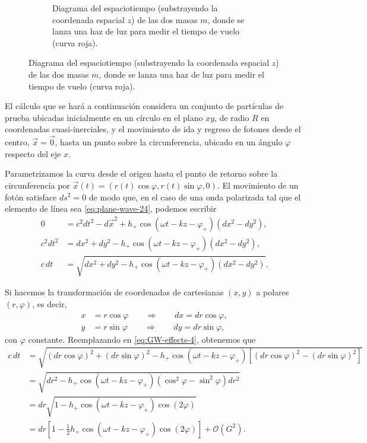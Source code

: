 \documentclass[letterpaper,11pt]{article}
\begin{document}
\begin{figure}
\begin{subfigure}[t]{0.39\textwidth}
        \caption{Diagrama del espaciotiempo (substrayendo la coordenada espacial $z$) de las dos masas $m$, donde se lanza una haz de luz para medir el tiempo de vuelo (curva roja).}
        \label{fig:Efecto-GW-2}
    \end{subfigure}
\end{figure}

El cálculo que se hará a continuación considera un conjunto de partículas de prueba ubicadas inicialmente en un círculo en el plano $xy$, de radio $R$ en coordenadas cuasi-inerciales, y el movimiento de ida y regreso de fotones desde el centro, $\vec{x} = \vec{0}$, hasta un punto sobre la circunferencia, ubicado en un ángulo $\varphi$ respecto del eje $x$.

Parametrizamos la curva desde el origen hasta el punto de retorno sobre la circunferencia por $\vec{x}(t) = (r(t) \cos\varphi, r(t) \sin\varphi,0)$. El movimiento de un fotón satisface $ds^2 = 0$ de modo que, en el caso de una onda polarizada tal que el elemento de línea sea \eqref{eq:plane-wave-24}, podemos escribir
\begin{align}
0 &= c^2dt^2 - d\vec{x}^2 + h_{+} \cos(\omega t -kz - \varphi_{+})(dx^2 - dy^2) , \\
c^2dt^2 &= dx^2 + dy^2 - h_{+} \cos(\omega t -kz - \varphi_{+})(dx^2 - dy^2), \\
c \,dt &= \sqrt{dx^2 + dy^2 - h_{+} \cos(\omega t -kz - \varphi_{+})(dx^2 - dy^2)}. \label{eq:GW-effects-4}
\end{align}

Si hacemos la transformación de coordenadas de cartesianas $(x,y)$ a polares $(r,\varphi)$, es decir,
\begin{align}
x &= r\cos\varphi \qquad \Rightarrow \qquad dx = dr \cos\varphi,\\
y &= r\sin\varphi \qquad \Rightarrow \qquad dy = dr \sin\varphi,
\end{align}
con $\varphi$ constante. Reemplazando en \eqref{eq:GW-effects-4}, obtenemos que
\begin{align}
c \,dt &= \sqrt{(dr \cos\varphi)^2 + (dr \sin\varphi)^2 - h_{+} \cos(\omega t -kz - \varphi_{+})[(dr \cos\varphi)^2 - (dr \sin\varphi)^2]} \nonumber \\
&= \sqrt{dr^2 - h_{+} \cos(\omega t -kz - \varphi_{+})(\cos^2\varphi - \sin^2\varphi)dr^2} \nonumber \\
&= dr \sqrt{1 - h_{+} \cos(\omega t -kz - \varphi_{+})\cos(2\varphi)} \nonumber \\
&= dr \left[1 - \frac{1}{2} h_{+} \cos(\omega t -kz - \varphi_{+})\cos(2\varphi)\right] + \mathcal{O}(G^2). 
\end{align}
\end{document}

